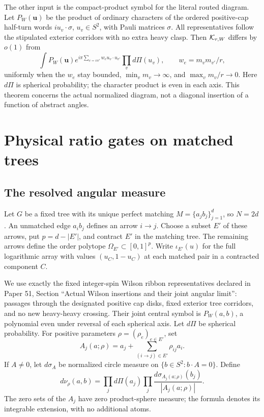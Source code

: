 The other input is the compact-product symbol for the literal routed diagram. Let \(P_W(\boldsymbol u)\) be the product of ordinary characters of the ordered positive-cap half-turn words \(iu_v\cdot\sigma\), \(u_v\in S^2\), with Pauli matrices \(\sigma\). All representatives follow the stipulated exterior corridors with no extra heavy clasp. Then \(\mathcal K_{r,W}\) differs by \(o(1)\) from
\begin{equation}\label{eq:symbol}
 \int P_W(\boldsymbol u)e^{i\pi\sum_{e=vv'}w_e u_v\cdot u_{v'}}
               \prod_v d\Pi(u_v),\qquad w_e=m_v m_{v'}/r,
\end{equation}
uniformly when the \(w_e\) stay bounded, \(\min_v m_v\to\infty\), and \(\max_v m_v/r\to0\). Here \(d\Pi\) is spherical probability; the character product is even in each axis. This theorem concerns the actual normalized diagram, not a diagonal insertion of a function of abstract angles.

\section{Physical ratio gates on matched trees}

\subsection{The resolved angular measure}
Let $G$ be a fixed tree with its unique perfect matching
$M=\{a_jb_j\}_{j=1}^d$, so $N=2d$. An unmatched edge $a_i b_j$
defines an arrow $i\to j$. Choose a subset $E'$ of these arrows,
put $p=d-|E'|$, and contract $E'$ in the matching tree. The remaining
arrows define the order polytope $\Omega_{E'}\subset[0,1]^p$.
Write $\iota_{E'}(u)$ for the full logarithmic array with values
$(u_C,1-u_C)$ at each matched pair in a contracted component $C$.

We use exactly the fixed integer-spin Wilson ribbon representatives
declared in Paper 51, Section ``Actual Wilson insertions and their
joint angular limit'': passages through the designated positive cap
disks, fixed exterior tree corridors, and no new heavy-heavy crossing.
Their joint central symbol is $P_W(a,b)$, a polynomial even under
reversal of each spherical axis. Let $d\Pi$ be spherical probability.
For positive parameters $\rho=(\rho_e)_{e\in E'}$, set
\[
 A_j(a;\rho)=a_j+\sum_{(i\to j)\in E'}\rho_{ij}a_i.
\]
If $A\ne0$, let $d\sigma_A$ be normalized circle measure on
$\{b\in S^2:b\cdot A=0\}$. Define
\begin{equation}\label{eq:ratio-measure}
 d\nu_\rho(a,b)=\prod_j d\Pi(a_j)
       \prod_j\frac{d\sigma_{A_j(a;\rho)}(b_j)}{|A_j(a;\rho)|}.
\end{equation}
The zero sets of the $A_j$ have zero product-sphere measure; the
formula denotes its integrable extension, with no additional atoms.

